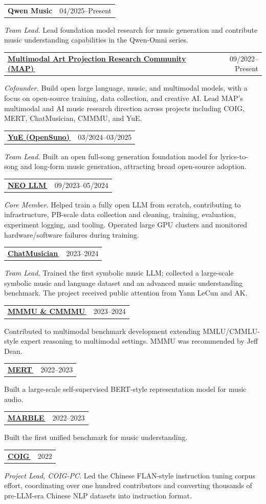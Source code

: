\documentclass[10.5pt,letterpaper]{article}
\makeatletter
\newcommand{\cvicon}[1]{\raisebox{-0.05ex}{\scriptsize\color{accent}#1}}
\newcommand{\faLink}{{\solidiconfont\symbol{"F0C1}}}
\newcommand{\linkglyph}{\,{\cvicon{\faLink}}}
\newcommand{\link}[2]{\href{#1}{#2\linkglyph}}
\newcommand{\daterange}[1]{{\color{muted}#1}}
\newcommand{\projectentry}[3]{%
  \begin{tabularx}{\linewidth}{@{}Xr@{}}
    \textbf{#1} & \daterange{#2}
  \end{tabularx}
  #3
}
\makeatother
\begin{document}
\projectentry{Qwen Music}{04/2025--Present}{
\textit{Team Lead.} Lead foundation model research for music generation and contribute music understanding capabilities in the Qwen-Omni series.
}

\projectentry{\link{https://huggingface.co/m-a-p}{Multimodal Art Projection Research Community (MAP)}}{09/2022--Present}{
\textit{Cofounder.} Build open large language, music, and multimodal models, with a focus on open-source training, data collection, and creative AI. Lead MAP's multimodal and AI music research direction across projects including COIG, MERT, ChatMusician, CMMMU, and YuE.
}

\projectentry{\link{https://github.com/multimodal-art-projection/YuE}{YuE (OpenSuno)}}{03/2024--03/2025}{
\textit{Team Lead.} Built an open full-song generation foundation model for lyrics-to-song and long-form music generation, attracting broad open-source adoption.
}

\projectentry{\link{https://huggingface.co/collections/m-a-p/neo-models-66395a5c9662bb58d5d70f04}{NEO LLM}}{09/2023--05/2024}{
\textit{Core Member.} Helped train a fully open LLM from scratch, contributing to infrastructure, PB-scale data collection and cleaning, training, evaluation, experiment logging, and tooling. Operated large GPU clusters and monitored hardware/software failures during training.
}

\projectentry{\link{https://huggingface.co/collections/m-a-p/chatmusician-65de07b3b87b189c2a588329}{ChatMusician}}{2023--2024}{
\textit{Team Lead.} Trained the first symbolic music LLM; collected a large-scale symbolic music and language dataset and an advanced music understanding benchmark. The project received public attention from Yann LeCun and AK.
}

\projectentry{\link{https://huggingface.co/datasets/MMMU/MMMU}{MMMU \& CMMMU}}{2023--2024}{
Contributed to multimodal benchmark development extending MMLU/CMMLU-style expert reasoning to multimodal settings. MMMU was recommended by Jeff Dean.
}

\projectentry{\link{https://huggingface.co/collections/m-a-p/mert-65a2cb498448f47df2d9e927}{MERT}}{2022--2023}{
Built a large-scale self-supervised BERT-style representation model for music audio.
}

\projectentry{\link{https://marble-bm.shef.ac.uk}{MARBLE}}{2022--2023}{
Built the first unified benchmark for music understanding.
}

\projectentry{\link{https://huggingface.co/collections/m-a-p/coig-65adf31cd6b4c93ba6894def}{COIG}}{2022}{
\textit{Project Lead, COIG-PC.} Led the Chinese FLAN-style instruction tuning corpus effort, coordinating over one hundred contributors and converting thousands of pre-LLM-era Chinese NLP datasets into instruction format.
}
\end{document}
